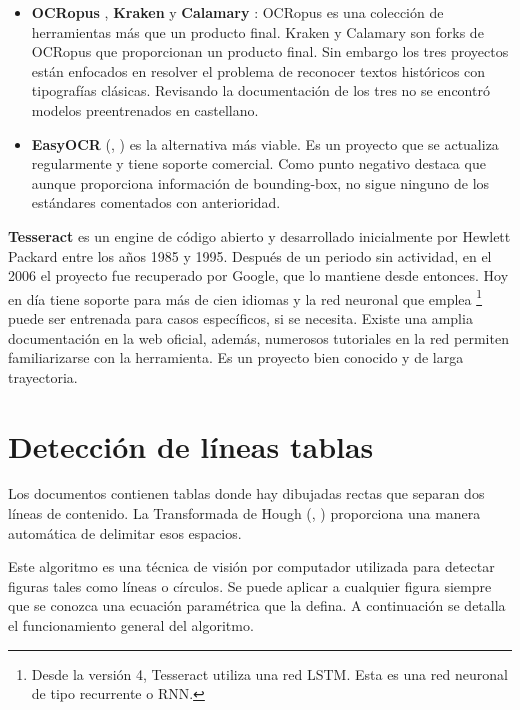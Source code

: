 \begin{itemize}
    \item \textbf{OCRopus} \cite{ocr_ocropus_ocropy_project}, \textbf{Kraken}  y \textbf{Calamary} \cite{ocr_calamari_journal}: OCRopus es una colección de herramientas más que un producto final. Kraken y Calamary son forks de OCRopus que proporcionan un producto final. Sin embargo los tres proyectos están enfocados en resolver el problema de reconocer textos históricos con tipografías clásicas. Revisando la documentación de los tres no se encontró modelos preentrenados en castellano.
    \item \textbf{EasyOCR} (\cite{ocr_easyocr_official}, \cite{ocr_easyocr_project}) es la alternativa más viable. Es un proyecto que se actualiza regularmente y tiene soporte comercial. Como punto negativo destaca que aunque proporciona información de bounding-box, no sigue ninguno de los estándares comentados con anterioridad.
\end{itemize}

\textbf{Tesseract} \cite{ocr_tesseract_smith_paper} es un engine de código abierto y desarrollado inicialmente por Hewlett Packard \cite{ocr_tesseract_v4_release_notes} entre los años 1985 y 1995. Después de un periodo sin actividad, en el 2006 el proyecto fue recuperado por Google, que lo mantiene desde entonces. Hoy en día tiene soporte para más de cien idiomas y la red neuronal que emplea \footnote{Desde la versión 4, Tesseract utiliza una red LSTM. Esta es una red neuronal de tipo recurrente o RNN.} puede ser entrenada para casos específicos, si se necesita. Existe una amplia documentación en la web oficial, además, numerosos tutoriales en la red permiten familiarizarse con la herramienta. Es un proyecto bien conocido y de larga trayectoria.

\section{Detección de líneas tablas}

Los documentos contienen tablas donde hay dibujadas rectas que separan dos líneas de contenido. La Transformada de Hough (\cite{hough_krishna_computerVision}, \cite{hough_grauman_presentation}) proporciona una manera automática de delimitar esos espacios.

Este algoritmo es una técnica de visión por computador utilizada para detectar figuras tales como líneas o círculos. Se puede aplicar a cualquier figura siempre que se conozca una ecuación paramétrica que la defina. A continuación se detalla el funcionamiento general del algoritmo.

